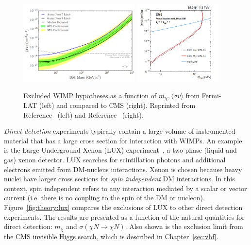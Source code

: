 \begin{figure}[]
\begin{center}
    \includegraphics[width=0.54\textwidth]{figures/theory/fermilat.png}
    \includegraphics[width=0.4\textwidth]{figures/theory/monojet.png}
    \caption{Excluded WIMP hypotheses as a function of ${m_\chi,\langle\sigma v\rangle}$ from Fermi-LAT (left) and compared to CMS (right).
             Reprinted from Reference~\cite{fermilat} (left) and Reference~\cite{monojet} (right).}
    \label{fig:theory:fermilat}
\end{center}
\end{figure}

\emph{Direct detection} experiments typically contain a large volume of instrumented material that has a large cross section for interaction with WIMPs.
An example is the Large Underground Xenon (LUX) experiment~\cite{lux}, a two phase (liquid and gas) xenon detector.
LUX searches for scintillation photons and additional electrons emitted from DM-nucleus interactions.
Xenon is chosen because heavy nuclei have larger cross sections for \emph{spin independent} DM interactions.
In this context, spin independent refers to any interaction mediated by a scalar or vector current (i.e. there is no coupling to the spin of the DM or nucleon). 
Figure~\ref{fig:theory:lux} compares the exclusions of LUX to other direct detection experiments.
The results are presented as a function of the natural quantities for direct detection: ${m_\chi}$ and ${\sigma(\chi N \rightarrow \chi N)}$.
Also shown is the exclusion limit from the CMS invisible Higgs search, which is described in Chapter~\ref{sec:vbf}.

